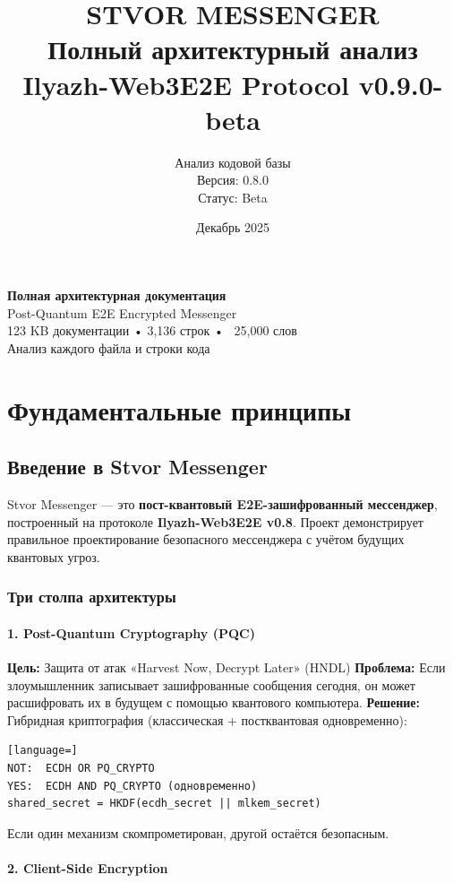 \documentclass[11pt,a4paper,oneside]{book}
\title{%
  \textbf{STVOR MESSENGER} \\
    {\large Полный архитектурный анализ} \\
    {\large Ilyazh-Web3E2E Protocol v0.9.0-beta}
}
\author{%
  Анализ кодовой базы \\
    Версия: 0.8.0 \\
  Статус: Beta
}
\date{Декабрь 2025}
\begin{document}
\maketitle
\begin{center}
  \Large{\textbf{Полная архитектурная документация}} \\
    Post-Quantum E2E Encrypted Messenger \\
    123 KB документации • 3,136 строк • ~25,000 слов \\
  Анализ каждого файла и строки кода
\end{center}
\tableofcontents
\pagebreak
\vspace{-1cm}\part{Фундаментальные принципы}
\vspace{-0.5cm}\chapter{Введение в Stvor Messenger}
Stvor Messenger — это \textbf{пост-квантовый E2E-зашифрованный мессенджер}, построенный на протоколе \textbf{Ilyazh-Web3E2E v0.8}. Проект демонстрирует правильное проектирование безопасного мессенджера с учётом будущих квантовых угроз.
\vspace{-0.3cm}\section{Три столпа архитектуры}
\vspace{-0.2cm}\subsection{1. Post-Quantum Cryptography (PQC)}
\textbf{Цель:} Защита от атак «Harvest Now, Decrypt Later» (HNDL)
\textbf{Проблема:} Если злоумышленник записывает зашифрованные сообщения сегодня, он может расшифровать их в будущем с помощью квантового компьютера.
\textbf{Решение:} Гибридная криптография (классическая + постквантовая одновременно):
\begin{lstlisting}[language=]
NOT:  ECDH OR PQ_CRYPTO
YES:  ECDH AND PQ_CRYPTO (одновременно)
shared_secret = HKDF(ecdh_secret || mlkem_secret)
\end{lstlisting}
Если один механизм скомпрометирован, другой остаётся безопасным.
\vspace{-0.2cm}\subsection{2. Client-Side Encryption}
\end{document}
